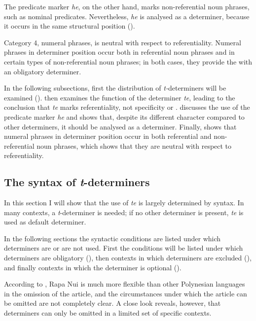 The predicate marker \textit{he}, on the other hand, marks non-referential noun phrases, such as nominal predicates. Nevertheless, \textit{he} is analysed as a determiner, because it occurs in the same structural position (). 

Category 4, numeral phrases, is neutral with respect to referentiality. Numeral phrases in determiner position occur both in referential noun phrases and in certain types of non-referential noun phrases; in both cases, they provide the  with an obligatory determiner.

In the following subsections, first the distribution of \textit{t-}determiners will be examined ().  then examines the function of the determiner \textit{te}, leading to the conclusion that \textit{te} marks referentiality, not specificity or .  discusses the use of the predicate marker \textit{he} and shows that, despite its different character compared to other determiners, it should be analysed as a determiner. Finally,  shows that numeral phrases in determiner position occur in both referential and non-referential noun phrases, which shows that they are neutral with respect to referentiality.

\subsection{The syntax of \textit{t}{}-determiners}\label{sec:5.3.2}

In this section I will show that the use of \textit{te} is largely determined by syntax. In many contexts, a \textit{t}{}-determiner is needed; if no other determiner is present, \textit{te} is used as default determiner. 

In the following sections the syntactic conditions are listed under which determiners are or are not used. First the conditions will be listed under which determiners are obligatory (), then contexts in which determiners are excluded (), and finally contexts in which the determiner is optional (). 

According to \citet{Chapin1974}, Rapa Nui is much more flexible than other Polynesian languages in the omission of the article, and the circumstances under which the article can be omitted are not completely clear. A close look reveals, however, that determiners can only be omitted in a limited set of specific contexts.

